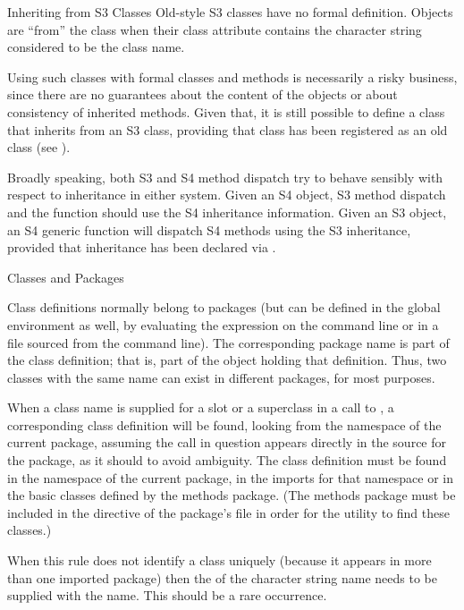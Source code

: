 \begin{Section}{Inheriting from S3 Classes}
Old-style S3 classes have no formal definition.  Objects are
``from'' the class when their class attribute contains the
character string considered to be the class name.

Using such classes with formal classes and methods is necessarily a
risky business, since there are no guarantees about the content of the
objects or about consistency of inherited methods.
Given that, it is still possible to define a class that inherits from
an S3 class, providing that class has been registered as an old class
(see ).

Broadly speaking, both S3 and S4 method dispatch try to behave
sensibly with respect to inheritance in either system.
Given an S4 object, S3 method dispatch and the 
function should use the S4 inheritance information.
Given an S3 object, an S4 generic function will dispatch S4 methods
using the S3 inheritance, provided that inheritance has been declared via
.

\end{Section}
%
\begin{Section}{Classes and Packages}

Class definitions normally belong to packages (but can be defined in
the  global environment as well, by evaluating the expression on the
command line or in a file sourced from the command line).
The corresponding package name is part of the class definition; that
is, part of the  object holding that
definition.  Thus, two classes with the same name can exist in
different packages, for most purposes.

When a class name is supplied for a slot or a superclass in a call to
, a
corresponding class definition will be found, looking from the
namespace of the current package, assuming the call in question appears directly in the source for the
package, as it should to avoid ambiguity.
The  class definition
must be found in the namespace of the current package, in the imports for that
namespace or in the basic classes defined by the methods package.
(The methods package must be included in the  directive
of the package's  file in order for the
 utility to find these classes.)

When this rule does not identify a class uniquely (because it appears
in more than one imported package) then the 
of the character string name needs to be supplied with the name.
This should be a rare occurrence.
\end{Section}
